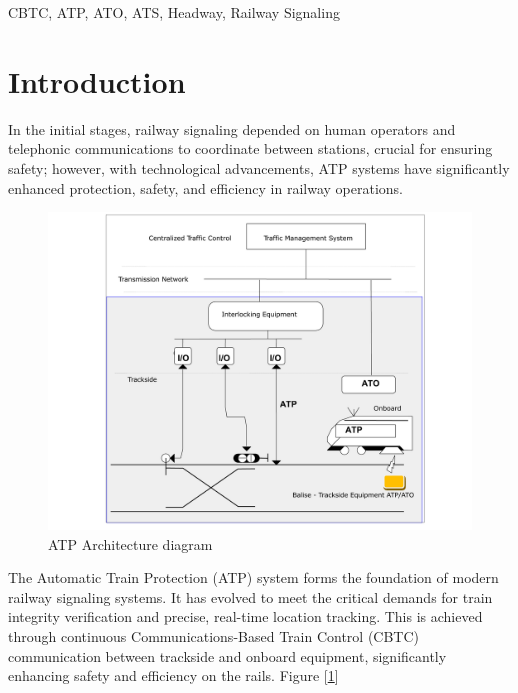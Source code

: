 \documentclass[conference]{IEEEtran}
\begin{document}
\begin{IEEEkeywords}
CBTC, ATP, ATO, ATS, Headway, Railway Signaling 
\end{IEEEkeywords}


\section{Introduction}
In the initial stages, railway signaling depended on human operators and telephonic communications to coordinate between stations, crucial for ensuring safety; however, with technological advancements, ATP systems have significantly enhanced protection, safety, and efficiency in railway operations.

\begin{figure}[ht]
    \centering
    \centerline{\includegraphics[scale=0.20, angle=0]{Imagenes_general/ATP_Architecture_Metro_Quito_1.pdf}}
    \caption{ATP Architecture diagram}
    \label{ATP Architecture diagram}
\end{figure}

The Automatic Train Protection (ATP) system forms the foundation of modern railway signaling systems. It has evolved to meet the critical demands for train integrity verification and precise, real-time location tracking. This is achieved through continuous Communications-Based Train Control (CBTC) communication between trackside and onboard equipment, significantly enhancing safety and efficiency on the rails. Figure [\ref{ATP Architecture diagram}]
\end{document}
